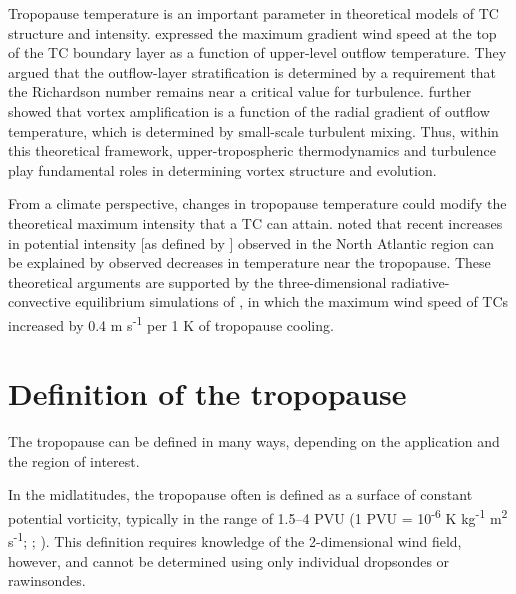 Tropopause temperature is an important parameter in theoretical models of TC structure and intensity.
\cite{EmanuelRotunno2011} expressed the maximum gradient wind speed at the top of the TC boundary layer as a function of upper-level outflow temperature.
They argued that the outflow-layer stratification is determined by a requirement that the Richardson number remains near a critical value for turbulence.
\cite{Emanuel2012} further showed that vortex amplification is a function of the radial gradient of outflow temperature, which is determined by small-scale turbulent mixing.
Thus, within this theoretical framework, upper-tropospheric thermodynamics and turbulence play fundamental roles in determining vortex structure and evolution.

From a climate perspective, changes in tropopause temperature could modify the theoretical maximum intensity that a TC can attain.
\cite{Emanueletal2013} noted that recent increases in potential intensity [as defined by \cite{BisterEmanuel1998}] observed in the North Atlantic region can be explained by observed decreases in temperature near the tropopause.
These theoretical arguments are supported by the three-dimensional radiative-convective equilibrium simulations of \cite{Wangetal2014}, in which the maximum wind speed of TCs increased by 0.4 m s\textsuperscript{-1} per 1 K of tropopause cooling.

\section{Definition of the tropopause}

The tropopause can be defined in many ways, depending on the application and the region of interest.

In the midlatitudes, the tropopause often is defined as a surface of constant potential vorticity, typically in the range of 1.5--4 PVU (1 PVU = 10\textsuperscript{-6} K kg\textsuperscript{-1} m\textsuperscript{2} s\textsuperscript{-1}; \citeauthor{Wilcoxetal2011} \citeyear{Wilcoxetal2011}; \citeauthor{HoltonHakim} \citeyear{HoltonHakim}).
This definition requires knowledge of the 2-dimensional wind field, however, and cannot be determined using only individual dropsondes or rawinsondes.


